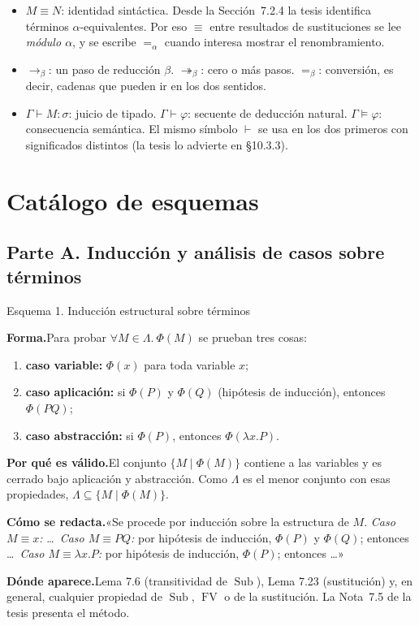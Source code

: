 \documentclass[11pt,a4paper]{article}
\newcommand{\forma}{\par\noindent\textbf{Forma.}\enspace}
\newcommand{\porque}{\par\smallskip\noindent\textbf{Por qué es válido.}\enspace}
\newcommand{\plantilla}{\par\smallskip\noindent\textbf{Cómo se redacta.}\enspace}
\newcommand{\donde}{\par\smallskip\noindent\textbf{Dónde aparece.}\enspace}
\newcommand{\Sub}{\operatorname{Sub}}
\newcommand{\FV}{\operatorname{FV}}
\newcommand{\bred}{\rightarrow_\beta}
\newcommand{\bmred}{\twoheadrightarrow_\beta}
\newcommand{\beq}{=_\beta}
\newcommand{\aeq}{=_\alpha}
\begin{document}
\begin{itemize}
  \item \(M\equiv N\): identidad sintáctica. Desde la Sección~7.2.4 la tesis
    identifica términos \(\alpha\)-equivalentes. Por eso \(\equiv\) entre
    resultados de sustituciones se lee \emph{módulo \(\alpha\)}, y se
    escribe \(\aeq\) cuando interesa mostrar el renombramiento.
  \item \(\bred\): un paso de reducción \(\beta\). \(\bmred\): cero o más
    pasos. \(\beq\): conversión, es decir, cadenas que pueden ir en los dos
    sentidos.
  \item \(\Gamma\vdash M:\sigma\): juicio de tipado. \(\Gamma\vdash\varphi\):
    secuente de deducción natural. \(\Gamma\vDash\varphi\): consecuencia
    semántica. El mismo símbolo \(\vdash\) se usa en los dos primeros con
    significados distintos (la tesis lo advierte en §10.3.3).
\end{itemize}

\section{Catálogo de esquemas}\label{sec:catalogo}

\subsection*{Parte A. Inducción y análisis de casos sobre términos}

\begin{esquema}{Esquema 1. Inducción estructural sobre términos}\label{esq:estructural}
\forma Para probar \(\forall M\in\Lambda.\ \Phi(M)\) se prueban tres cosas:
\begin{enumerate}[label=(\roman*)]
  \item \textbf{caso variable:} \(\Phi(x)\) para toda variable \(x\);
  \item \textbf{caso aplicación:} si \(\Phi(P)\) y \(\Phi(Q)\) (hipótesis de
    inducción), entonces \(\Phi(PQ)\);
  \item \textbf{caso abstracción:} si \(\Phi(P)\), entonces
    \(\Phi(\lambda x.P)\).
\end{enumerate}
\porque El conjunto \(\{M\mid\Phi(M)\}\) contiene a las variables y es cerrado
bajo aplicación y abstracción. Como \(\Lambda\) es el menor conjunto con esas
propiedades, \(\Lambda\subseteq\{M\mid\Phi(M)\}\).

\plantilla «Se procede por inducción sobre la estructura de \(M\).
\emph{Caso \(M\equiv x\):} \dots\ \emph{Caso \(M\equiv PQ\):} por hipótesis de
inducción, \(\Phi(P)\) y \(\Phi(Q)\); entonces \dots\ \emph{Caso
\(M\equiv\lambda x.P\):} por hipótesis de inducción, \(\Phi(P)\); entonces
\dots»

\donde Lema 7.6 (transitividad de \(\Sub\)), Lema 7.23 (sustitución) y, en
general, cualquier propiedad de \(\Sub\), \(\FV\) o de la sustitución. La
Nota~7.5 de la tesis presenta el método.
\end{esquema}
\end{document}
